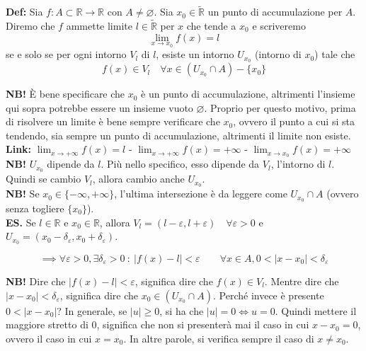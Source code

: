 \documentclass{article}
\begin{document}
\noindent\textbf{Def:} Sia $f: A \subset \mathbb{R} \xrightarrow{} \mathbb{R}$ con $A \neq \varnothing$. Sia $x_0 \in \widetilde{\mathbb{R}}$ un punto di accumulazione per $A$. Diremo che $f$ ammette limite $l \in \widetilde{\mathbb{R}}$ per $x$ che tende a $x_0$ e scriveremo  $$\lim_{x \to x_0} f(x) = l$$ se e solo se per ogni intorno $V_l$ di $l$, esiste un intorno $U_{x_0}$ (intorno di $x_0$) tale che $$f(x) \in V_l \quad \forall x \in (U_{x_0} \cap A) - \{x_0\}$$

\noindent\textbf{NB!} È bene specificare che $x_0$ è un punto di accumulazione, altrimenti l'insieme qui sopra potrebbe essere un insieme vuoto $\varnothing$. Proprio per questo motivo, prima di risolvere un limite è bene sempre verificare che $x_0$, ovvero il punto a cui si sta tendendo, sia sempre un punto di accumulazione, altrimenti il limite non esiste.\\

\noindent\textbf{Link:} \href{https://www.geogebra.org/m/h4at6wmh}{$\lim_{x\to +\infty}f(x) = l$} - \href{https://www.geogebra.org/m/pde8kmyk}{$\lim_{x\to +\infty}f(x) = +\infty$} - \href{https://www.geogebra.org/m/u28wkgdt}{$\lim_{x\to x_0}f(x) = +\infty$} \\

\noindent\textbf{NB!} $U_{x_0}$ dipende da $l$. Più nello specifico, esso dipende da $V_l$, l'intorno di $l$. Quindi se cambio $V_l$, allora cambio anche $U_{x_0}$. \\

\noindent\textbf{NB!} Se $x_0 \in \{-\infty, + \infty\}$, l'ultima intersezione è da leggere come $U_{x_0} \cap A$ (ovvero senza togliere $\{x_0\}$).\\

\noindent\textbf{ES.} Se $l \in \mathbb{R}$ e $x_0 \in \mathbb{R}$, allora $V_l = (l - \varepsilon, l + \varepsilon) \quad \forall \varepsilon > 0$ e $U_{x_0} = (x_0 - \delta_\varepsilon, x_0 + \delta_\varepsilon)$.

\begin{equation*}
    \implies \forall \varepsilon > 0, \exists \delta_\varepsilon > 0 \ : \ | f(x) - l | < \varepsilon \qquad \forall x \in A, 0 < | x - x_0 | < \delta_\varepsilon
\end{equation*}

\noindent\textbf{NB!} Dire che $| f(x) - l | < \varepsilon$, significa dire che $f(x) \in V_l$. Mentre dire che $| x - x_0 | < \delta_\varepsilon$, significa dire che $x_0 \in (U_{x_0} \cap A)$. Perché invece è presente $0 < | x - x_0 |$? In generale, se $|u| \geq 0$, si ha che $|u| = 0 \iff u = 0$. Quindi mettere il maggiore stretto di $0$, significa che non si presenterà mai il caso in cui $x - x_0 = 0$, ovvero il caso in cui $x = x_0$. In altre parole, si verifica sempre il caso di $x \neq x_0$.\\
\end{document}

